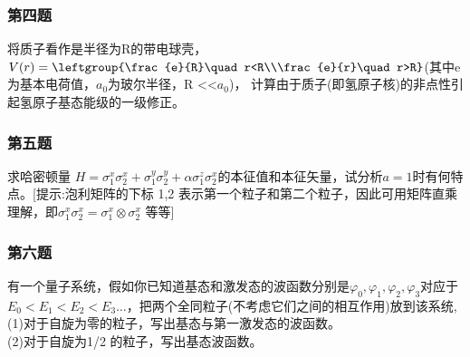 \subsubsection{第四题}
将质子看作是半径为R的带电球壳，$V(r)=\leftgroup{\frac{e}{R}\quad r<R\\\frac{e}{r}\quad r>R}$(其中e为基本电荷值，$a_0$为玻尔半径，R <<$a_0$)， 计算由于质子(即氢原子核)的非点性引起氢原子基态能级的一级修正。
\subsubsection{第五题}
求哈密顿量 $H=\sigma_1^x\sigma_2^x+\sigma_1^y\sigma_2^y+\alpha \sigma_1^z\sigma^x_2$的本征值和本征矢量，试分析$a =1$时有何特点。[提示:泡利矩阵的下标 1,2 表示第一个粒子和第二个粒子，因此可用矩阵直乘理解，即$\sigma_1^x\sigma_2^x=\sigma_1^x \otimes \sigma_2^x$ 等等]
\subsubsection{第六题}
有一个量子系统，假如你已知道基态和激发态的波函数分别是$\varphi_0,\varphi_1,\varphi_2,\varphi_3$对应于$E_0<E_1<E_2<E_3 \dots$，把两个全同粒子(不考虑它们之间的相互作用)放到该系统,\\
(1)对于自旋为零的粒子，写出基态与第一激发态的波函数。\\
(2)对于自旋为1/2 的粒子，写出基态波函数。

